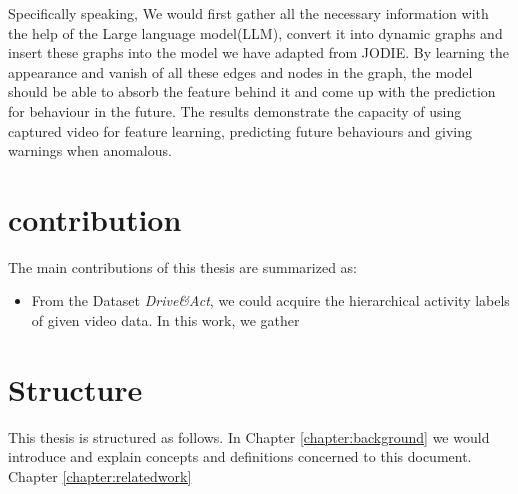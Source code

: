 Specifically speaking, We would first gather all the necessary information with the help of the Large language model(LLM), convert it into dynamic graphs and insert these graphs into the model we have adapted from JODIE. By learning the appearance and vanish of all these edges and nodes in the graph, the model should be able to absorb the feature behind it and come up with the prediction for behaviour in the future. The results demonstrate the capacity of using captured video for feature learning, predicting future behaviours and giving warnings when anomalous.


\section{contribution}
The main contributions of this thesis are summarized as:
\begin{itemize}
    \item From the Dataset \textit{Drive&Act}, we could acquire the hierarchical activity labels of given video data. In this work, we gather 
\end{itemize}


\section{Structure}

This thesis is structured as follows. In Chapter \ref{chapter:background} we would introduce and explain concepts and definitions concerned to this document. Chapter \ref{chapter:relatedwork}





